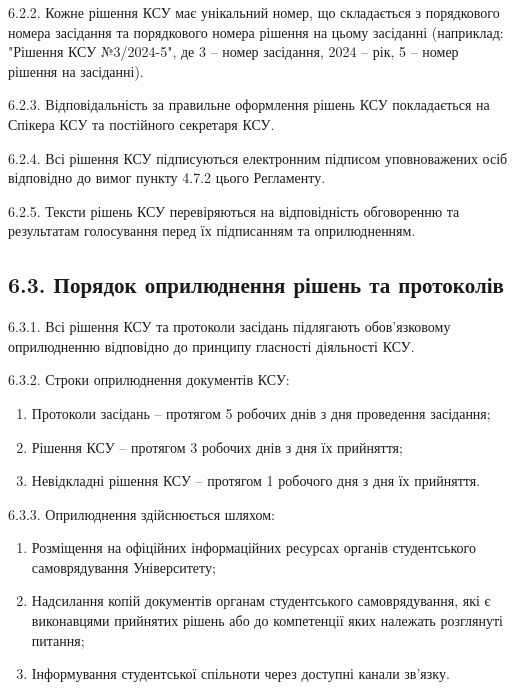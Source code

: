     6.2.2. Кожне рішення КСУ має унікальний номер, що складається з порядкового номера засідання та порядкового номера рішення на цьому засіданні (наприклад: "Рішення КСУ №3/2024-5", де 3 -- номер засідання, 2024 -- рік, 5 -- номер рішення на засіданні).

    6.2.3. Відповідальність за правильне оформлення рішень КСУ покладається на Спікера КСУ та постійного секретаря КСУ.

    6.2.4. Всі рішення КСУ підписуються електронним підписом уповноважених осіб відповідно до вимог пункту 4.7.2 цього Регламенту.

    6.2.5. Тексти рішень КСУ перевіряються на відповідність обговоренню та результатам голосування перед їх підписанням та оприлюдненням.

\subsection*{6.3. Порядок оприлюднення рішень та протоколів}
    6.3.1. Всі рішення КСУ та протоколи засідань підлягають обов'язковому оприлюдненню відповідно до принципу гласності діяльності КСУ.

    6.3.2. Строки оприлюднення документів КСУ:

        \begin{enumerate}[label=\alph*)]
            \item Протоколи засідань -- протягом 5 робочих днів з дня проведення засідання;
            \item Рішення КСУ -- протягом 3 робочих днів з дня їх прийняття;
            \item Невідкладні рішення КСУ -- протягом 1 робочого дня з дня їх прийняття.
        \end{enumerate}

    6.3.3. Оприлюднення здійснюється шляхом:

        \begin{enumerate}[label=\alph*)]
            \item Розміщення на офіційних інформаційних ресурсах органів студентського самоврядування Університету;
            \item Надсилання копій документів органам студентського самоврядування, які є виконавцями прийнятих рішень або до компетенції яких належать розглянуті питання;
            \item Інформування студентської спільноти через доступні канали зв'язку.
        \end{enumerate}

